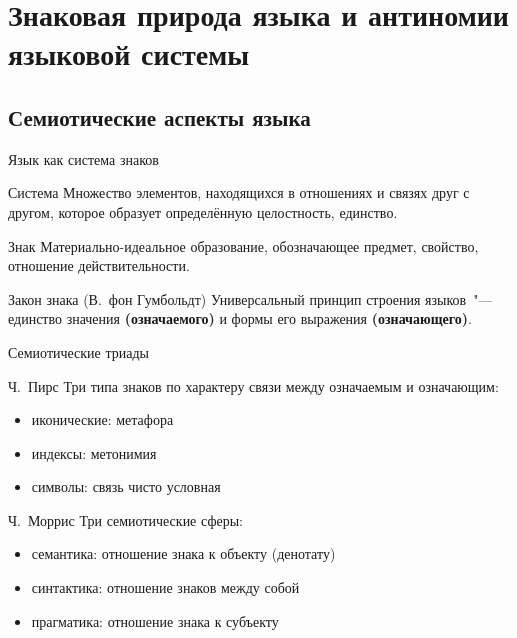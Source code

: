 \frame{\titlepage}

\section{Знаковая природа языка и антиномии языковой системы}

\subsection{Семиотические аспекты языка}

\frame{\tableofcontents}

\begin{frame}{Язык как система знаков}
    \begin{block}{Система}
        Множество элементов, находящихся в отношениях и связях друг с другом, которое образует определённую целостность, единство.
    \end{block}

    \begin{block}{Знак}
        Материально-идеальное образование, обозначающее предмет, свойство, отношение действительности.
    \end{block}

    \vfill

    \begin{alertblock}{Закон знака (В.~фон Гумбольдт)}
        Универсальный принцип строения языков~"--- единство значения \textbf{(означаемого)} и формы его выражения \textbf{(означающего)}.
    \end{alertblock}
\end{frame}

\begin{frame}{Семиотические триады}
    \begin{block}{Ч.~Пирс}
        Три типа знаков по характеру связи между означаемым и означающим: \begin{itemize}
            \item иконические: метафора
            \item индексы: метонимия
            \item символы: связь чисто условная
        \end{itemize}
    \end{block}

    \begin{block}{Ч.~Моррис}
        Три семиотические сферы: \begin{itemize}
            \item семантика: отношение знака к объекту (денотату)
            \item \alert{синтактика}: отношение знаков между собой
            \item прагматика: отношение знака к субъекту
        \end{itemize}
    \end{block}
\end{frame}

